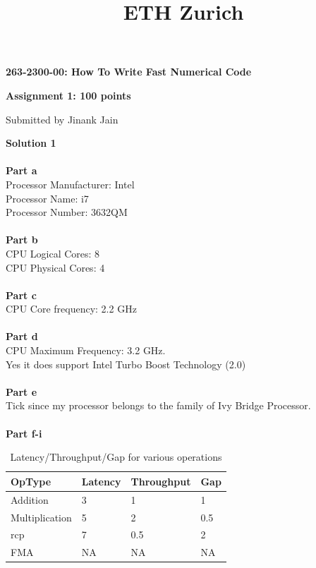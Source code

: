 \documentclass[letterpaper, 11pt]{article}
\title{ETH Zurich}
\begin{document}

\begin{center}
\Large \bf 263-2300-00: How To Write Fast Numerical Code

\Large \bf Assignment 1: 100 points

\large Submitted by Jinank Jain
\end{center}

\textbf{Solution 1}\\ \\
\textbf{Part a} \\
Processor Manufacturer: Intel \\
Processor Name: i7 \\
Processor Number: 3632QM \\ \\
\textbf{Part b} \\
CPU Logical Cores: 8 \\
CPU Physical Cores: 4 \\ \\ 
\textbf{Part c} \\
CPU Core frequency: 2.2 GHz \\ \\
\textbf{Part d} \\
CPU Maximum Frequency: 3.2 GHz. \\
Yes it does support Intel Turbo Boost Technology (2.0) \\ \\
\textbf{Part e} \\
Tick since my processor belongs to the family of Ivy Bridge Processor. \\ \\
\textbf{Part f-i}
\begin{table}[h!]
\centering
\label{my-label}
\begin{tabular}{|l|l|l|l|}
\hline
OpType         & Latency & Throughput & Gap \\ \hline
Addition       & 3       & 1           &  1   \\ \hline
Multiplication & 5       &  2         & 0.5    \\ \hline
rcp            &  7       &    0.5        &  2   \\ \hline
FMA            & NA      & NA         & NA  \\ \hline
\end{tabular}
\caption{Latency/Throughput/Gap for various operations}
\end{table}
\end{document}
